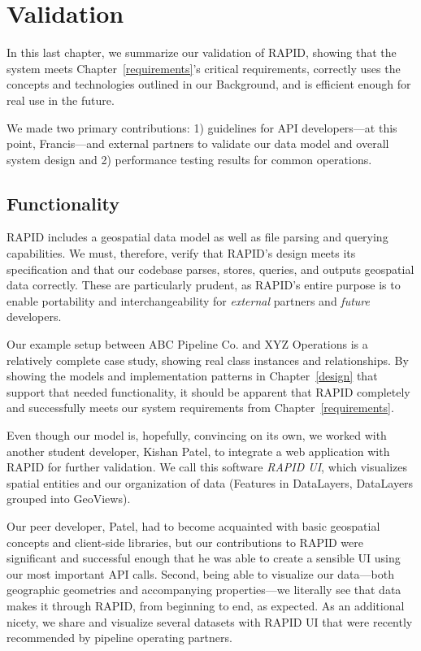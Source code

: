 \chapter{Validation}
\label{validation}
In this last chapter, we summarize our validation of RAPID, showing that the system meets Chapter~\ref{requirements}'s critical requirements, correctly uses the concepts and technologies outlined in our Background, and is efficient enough for real use in the future.

We made two primary contributions: 1) guidelines for API developers---at this point, Francis---and external partners to validate our data model and overall system design and 2) performance testing results for common operations.

\section{Functionality}
RAPID includes a geospatial data model as well as file parsing and querying capabilities. We must, therefore, verify that RAPID's design meets its specification and that our codebase parses, stores, queries, and outputs geospatial data correctly. These are particularly prudent, as RAPID's entire purpose is to enable portability and interchangeability for \textit{external} partners and \textit{future} developers.

Our example setup between ABC Pipeline Co. and XYZ Operations is a relatively complete case study, showing real class instances and relationships. By showing the models and implementation patterns in Chapter~\ref{design} that support that needed functionality, it should be apparent that RAPID completely and successfully meets our system requirements from Chapter~\ref{requirements}.

Even though our model is, hopefully, convincing on its own, we worked with another student developer, Kishan Patel, to integrate a web application with RAPID for further validation. We call this software \textit{RAPID UI}, which visualizes spatial entities and our organization of data (Features in DataLayers, DataLayers grouped into GeoViews).

Our peer developer, Patel, had to become acquainted with basic geospatial concepts and client-side libraries, but our contributions to RAPID were significant and successful enough that he was able to create a sensible UI using our most important API calls. Second, being able to visualize our data---both geographic geometries and accompanying properties---we literally see that data makes it through RAPID, from beginning to end, as expected. As an additional nicety, we share and visualize several datasets with RAPID UI that were recently recommended by pipeline operating partners.


